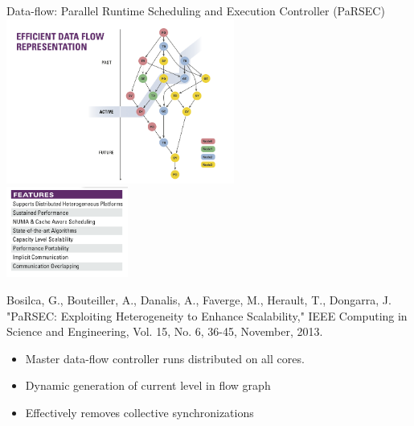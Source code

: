\begin{frame}{Data-flow: Parallel Runtime Scheduling and Execution
    Controller (PaRSEC)}
  \vspace{-.1cm}
  \hspace{2cm}\includegraphics[trim=0cm 0cm 0cm
  1cm,clip=true,width=7.5cm]{../common/pics/comm/PaRSEC1.png}
 \\[-3.4cm]
  \includegraphics[width=4cm]{../common/pics/comm/PaRSEC2.png}
  \hspace{5cm}{\tiny Graphic from icl.cs.utk.edu}
  \begin{block}
    {\tiny Bosilca, G., Bouteiller, A., Danalis, A., Faverge,
      M., Herault, T., Dongarra, J. "PaRSEC: Exploiting Heterogeneity
      to Enhance Scalability," IEEE Computing in Science and
      Engineering, Vol. 15, No. 6, 36-45, November, 2013.}
    \begin{itemize}\small
    \item Master data-flow controller runs distributed on all cores.
    \item Dynamic generation of current level in flow graph
    \item Effectively removes collective synchronizations
    \end{itemize}
  \end{block}
\end{frame}
